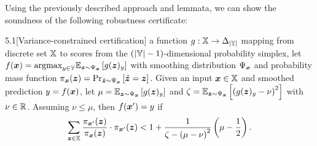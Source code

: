 Using the previously described approach and lemmata, we can show the soundness of the following robustness certificate:
\begin{customthm}{5.1}[Variance-constrained certification]\label{theorem_1}
a function $g : {\mathbb{X}} \rightarrow \Delta_{|{\mathbb{Y}}|}$ mapping from discrete set ${\mathbb{X}}$ to scores from the $\left(|{\mathbb{Y}}| -1\right)$-dimensional probability simplex, let 
	$f({\bm{x}}) = \mathrm{argmax}_{y \in {\mathbb{Y}}}
	\mathbb{E}_{{\bm{z}} \sim \Psi_{\bm{x}}}
	\left[g({\bm{z}})_y\right]$ with smoothing distribution $\Psi_{\bm{x}}$ and probability mass function
	$\pi_{{\bm{x}}}({\bm{z}}) = \Pr_{\tilde{{\bm{z}}} \sim \Psi_{\bm{x}}}\left[\tilde{{\bm{z}}} = {\bm{z}}\right]$.
	Given an input ${\bm{x}} \in {\mathbb{X}}$ and smoothed prediction ${y} = f({\bm{x}})$, 
	let $\mu = \mathbb{E}_{{\bm{z}} \sim \Psi_{\bm{x}}}\left[g({\bm{z}})_y\right]$
	and $\zeta = \mathbb{E}_{{\bm{z}} \sim \Psi_{\bm{x}}}\left[\left(g({\bm{z}})_y - \nu \right)^2\right]$ with $\nu \in {\mathbb{R}}$.
	Assuming $\nu \leq \mu$, then $f({\bm{x}}') = y$ if 
	\begin{equation}\label{eq:variance_constrained_cert_appendix}
		\sum_{{\bm{z}} \in {\mathbb{X}}} \frac{\pi_{{\bm{x}}'}({\bm{z}})}{\pi_{{\bm{x}}}({\bm{z}})} \cdot \pi_{{\bm{x}}'}({\bm{z}})
		< 1 + \frac{1}{\zeta - \left(\mu - \nu  \right)^2} \left(\mu - \frac{1}{2}\right).
	\end{equation}
\end{customthm}
